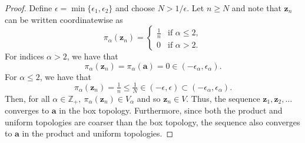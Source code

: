 \documentclass[a4paper,10pt]{article}
\newcommand{\bz}{\mathbf{z}}
\newcommand{\ZZ}{\mathbb{Z}}
\begin{document}
\begin{solution}
\begin{proof}
        Define $\epsilon = \min\{\epsilon_1, \epsilon_2\}$ and choose $N > 1 / \epsilon$.
        Let $n \geq N$ and note that $\bz_n$ can be written coordinatewise as
        \begin{equation*}
            \pi_\alpha(\bz_n) = \begin{cases}
                \tfrac{1}{n}    & \text{if } \alpha \leq 2, \\
                0               & \text{if } \alpha > 2.
            \end{cases}
        \end{equation*}
        For indices $\alpha > 2$, we have that
        \begin{equation*}
            \pi_\alpha(\bz_n) = \pi_\alpha(\mathbf{a}) = 0 \in (-\epsilon_\alpha, \epsilon_\alpha).
        \end{equation*}
        For $\alpha \leq 2$, we have that
        \begin{equation*}
            \pi_\alpha(\bz_n) = \tfrac{1}{n} \leq \tfrac{1}{N} \in (-\epsilon, \epsilon) \subset (-\epsilon_\alpha, \epsilon_\alpha).
        \end{equation*}
        Then, for all $\alpha \in \ZZ_+,~ \pi_\alpha(\bz_n) \in V_\alpha$ and so $\bz_n \in V$.
        Thus, the sequence $\bz_1, \bz_2, \ldots$ converges to $\mathbf{a}$ in the box topology.
        Furthermore, since both the product and uniform topologies are coarser than the box topology, the sequence also converges to $\mathbf{a}$ in the product and uniform topologies.
    \end{proof}

\end{solution}
\end{document}
